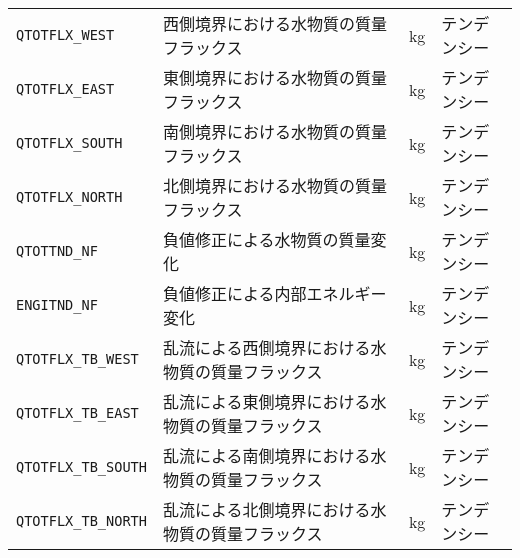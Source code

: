 \begin{longtable}{|l|l|l|l|}
      \verb|QTOTFLX_WEST|  & 西側境界における水物質の質量フラックス     & kg & テンデンシー \\
      \verb|QTOTFLX_EAST|  & 東側境界における水物質の質量フラックス     & kg & テンデンシー \\
      \verb|QTOTFLX_SOUTH| & 南側境界における水物質の質量フラックス     & kg & テンデンシー \\
      \verb|QTOTFLX_NORTH| & 北側境界における水物質の質量フラックス     & kg & テンデンシー \\
      \verb|QTOTTND_NF|       & 負値修正による水物質の質量変化              & kg & テンデンシー \\
      \verb|ENGITND_NF|       & 負値修正による内部エネルギー変化             & kg & テンデンシー \\
      \verb|QTOTFLX_TB_WEST|  & 乱流による西側境界における水物質の質量フラックス & kg & テンデンシー \\
      \verb|QTOTFLX_TB_EAST|  & 乱流による東側境界における水物質の質量フラックス & kg & テンデンシー \\
      \verb|QTOTFLX_TB_SOUTH| & 乱流による南側境界における水物質の質量フラックス & kg & テンデンシー \\
      \verb|QTOTFLX_TB_NORTH| & 乱流による北側境界における水物質の質量フラックス & kg & テンデンシー \\
\end{longtable}

